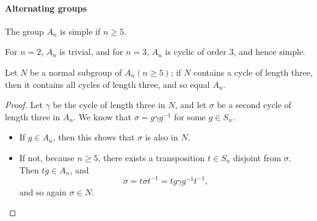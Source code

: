 \paragraph{Alternating groups}

\begin{theorem}[Galois]
  The group \( A_n \) is simple if \( n \geq 5 \).
\end{theorem}

\begin{remark}
  For \( n = 2 \), \( A_n \) is trivial, and for \( n = 3 \), \( A_n \) is cyclic of order \( 3 \), and hence simple.
\end{remark}

\begin{lemma}
  Let \( N \) be a normal subgroup of \( A_n(n \geq 5) \);
  if \( N \) contains a cycle of length three, then it contains all cycles of length three, and so equal \( A_n \).
\end{lemma}
\begin{proof}
  Let \( \gamma \) be the cycle of length three in \( N \), and let \( \sigma \) be a second cycle of length three in \( A_n \).
  We know that \( \sigma = g \gamma g^{-1} \) for some \( g \in S_n \).
  \begin{itemize}
    \item If \( g \in A_n \), then this shows that \( \sigma \) is also in \( N \).
    \item If not, because \( n \geq 5 \), there exists a transposition \( t \in S_n \) disjoint from \( \sigma \).
      Then \( tg \in A_n \), and
      \[
        \sigma = t \sigma t^{-1} = tg \gamma g^{-1} t^{-1},
      \]
      and so again \( \sigma \in N \).
  \end{itemize}
\end{proof}

